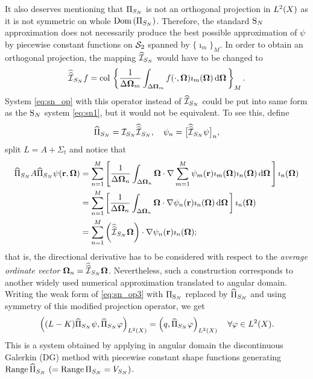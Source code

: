 It also deserves mentioning that $\Projop[S_N]$ is not an orthogonal projection in \linebreak[4]\mbox{$\Lp[2](X)$}
as it is not symmetric on whole $\Dom{\Projop[S_N]}$. Therefore, the standard $\SN$ approximation does not
necessarily produce the best possible approximation of $\psi$ by piecewise constant functions on $\Sphere$ spanned by 
$\{\imath_m\}_M$. In order to obtain an orthogonal projection, the mapping $\PihSN$ would have to be changed to 
$$
	\widehat{\widehat{\mathcal{I}}}_{S_N} f = \col\left\{\frac{1}{\Delta\bomega_m}\int_{\Delta\bomega_m}f(\cdot,\bomega)
	\imath_m(\bomega)\,\d{\bomega}\right\}_{\idxset{M}}.
$$
System \eqref{eq:sn_op} with this operator instead of $\PihSN$ could be put into same form as the $\SN$ system
\eqref{eq:sn1}, but it would not be equivalent. To see this, define 
$$
	\widehat\Proj_{S_N} = \PiSN\widehat{\widehat{\mathcal{I}}}_{S_N},\quad \psi_n =
	\bigl[\widehat{\widehat{\mathcal{I}}}_{S_N}\psi\bigr]_n, 
$$ 
split $L = A + \Sigma_t$ and notice that
$$
\begin{aligned}
	\widehat\Proj_{S_N} A \widehat\Proj_{S_N} \psi(\br,\bomega) &= \sum_{n=1}^M  
	\left[\frac{1}{\Delta\bomega_n}\int_{\Delta\bomega_n}\bomega\cdot\nabla \sum_{m=1}^M
	\psi_m(\br) \imath_m(\bomega)\imath_n(\bomega)\,\d{\bomega}\right] \imath_n(\bomega)\\
	& = \sum_{n=1}^M  
	\left[\frac{1}{\Delta\bomega_n}\int_{\Delta\bomega_n}\bomega\cdot\nabla 
	\psi_n(\br) \imath_n(\bomega)\,\d{\bomega}\right] \imath_n(\bomega)\\
	& = \sum_{n=1}^M \left(\widehat{\widehat{\mathcal{I}}}_{S_N}\bomega\right)  \cdot\nabla 
	\psi_n(\br) \imath_n(\bomega);
\end{aligned}
$$
that is, the directional derivative has to be considered with respect to the \textit{average ordinate vector}
$\bomega_n = \widehat{\widehat{\mathcal{I}}}_{S_N}\bomega$. Nevertheless, such a construction corresponds to
another widely used numerical approximation translated to angular domain.  Writing the weak form of \eqref{eq:sn_op3} 
with $\Projop[\SN]$ replaced by $\widehat\Proj_{S_N}$ and using symmetry of this modified projection operator, we get
\begin{equation}\label{eq:SN_weak}
	\left((\op{L}  - \op{K})\widehat\Proj_{S_N} \psi, \widehat\Proj_{S_N} \varphi \right)_{\Lp[2](X)} = \left( q,
	\widehat\Proj_{S_N} \varphi \right)_{\Lp[2](X)}\quad \forall \varphi\in \Lp[2](X). 
\end{equation}
This is a system obtained by applying in angular domain the discontinuous Galerkin (DG) method
 with piecewise constant shape functions generating \linebreak
\mbox{$\Rng \widehat\Proj_{S_N}\ (= \Rng \Projop[S_N] = V_{S_N})$}.   %

